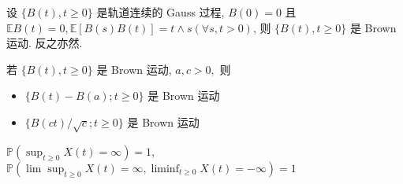 \documentclass[10pt]{yerbaformat}
\begin{document}
\begin{theorem}
    设 $\{B(t), t \geq 0\}$ 是轨道连续的 Gauss 过程, $B(0)=0$ 且 $ \mathbb{E} B(t)=0, \mathbb{E}[B(s) B(t)]=t \wedge s(\forall s, t>0)$, 则 $\{B(t), t \geq 0\}$ 是 Brown 运动. 反之亦然.
\end{theorem}

\begin{theorem}[不变性]
    若 $\{B(t), t \geq 0\}$ 是 Brown 运动, $a, c>0,$ 则
    \begin{itemize}
        \item $\{B(t)-B(a) ; t \geq 0\}$ 是 Brown 运动
        \item $\{B(c t) / \sqrt{c} ; t \geq 0\}$ 是 Brown 运动
    \end{itemize}
\end{theorem}


\begin{theorem}
    $\mathbb{P}\left(\sup _{t \geq 0} X(t)=\infty\right)=1$, $\mathbb{P}\left(\lim \sup _{t \geq 0} X(t)=\infty, \liminf _{t \geq 0} X(t)=-\infty\right)=1$
\end{theorem}

\end{document}
